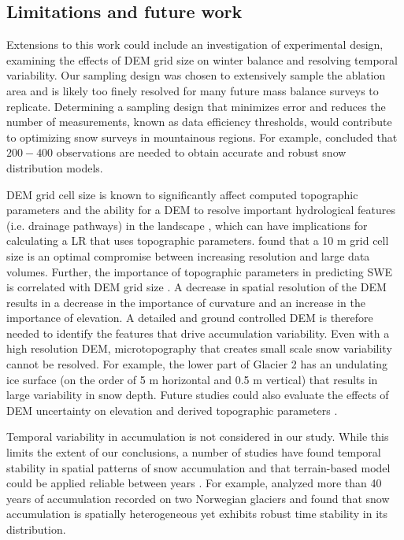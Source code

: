 \documentclass[twocolumn, letterpaper]{igs}
\begin{document}
\subsection{Limitations and future work}

Extensions to this work could include an investigation of experimental design, examining the effects of DEM grid size on winter balance and resolving temporal variability. Our sampling design was chosen to extensively sample the ablation area and is likely too finely resolved for many future mass balance surveys to replicate. Determining a sampling design that minimizes error and reduces the number of measurements, known as data efficiency thresholds, would contribute to optimizing snow surveys in mountainous regions. For example, \cite{Lopez2010} concluded that $200-400$ observations are needed to obtain accurate and robust snow distribution models. 

DEM grid cell size is known to significantly affect computed topographic parameters and the ability for a DEM to resolve important hydrological features (i.e. drainage pathways) in the landscape \citep{Zhang1994, Garbrecht1994, Guo-an2001, Lopez2010}, which can have implications for calculating a LR that uses topographic parameters.  \cite{Zhang1994} found that a 10 m grid cell size is an optimal compromise between increasing resolution and large data volumes. Further, the importance of topographic parameters in predicting SWE is correlated with DEM grid size \citep[e.g.][]{Kienzle2004, Lopez2010}. A decrease in spatial resolution of the DEM results in a decrease in the importance of curvature and an increase in the importance of elevation. A detailed and ground controlled DEM is therefore needed to identify the features that drive accumulation variability. Even with a high resolution DEM, microtopography that creates small scale snow variability cannot be resolved. For example, the lower part of Glacier 2 has an undulating ice surface (on the order of 5 m horizontal and 0.5 m vertical) that results in large variability in snow depth. Future studies could also evaluate the effects of DEM uncertainty on elevation and derived topographic parameters \citep [e.g.][]{Guo-an2001, Wechsler2006}. 

Temporal variability in accumulation is not considered in our study. While this limits the extent of our conclusions, a number of studies have found temporal stability in spatial patterns of snow accumulation and that terrain-based model could be applied reliable between years \citep[e.g.][]{Grunewald2013}. For example, \cite{Walmsley2015} analyzed more than 40 years of accumulation recorded on two Norwegian glaciers and found that snow accumulation is spatially heterogeneous yet exhibits robust time stability in its distribution. 
\end{document}
